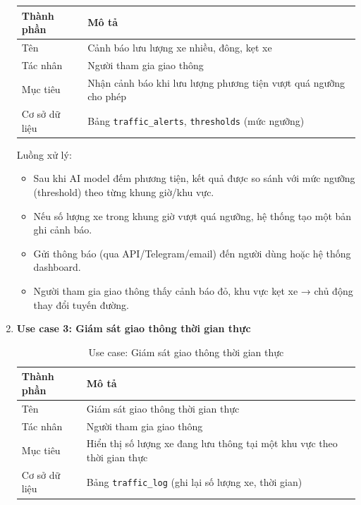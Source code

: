 \begin{enumerate}
    \begin{table}[H]
        \centering
        \begin{tabular}{|p{4cm}|p{10cm}|}
            \hline
            \textbf{Thành phần} & \textbf{Mô tả} \\ \hline
            Tên & Cảnh báo lưu lượng xe nhiều, đông, kẹt xe \\ \hline
            Tác nhân & Người tham gia giao thông \\ \hline
            Mục tiêu & Nhận cảnh báo khi lưu lượng phương tiện vượt quá ngưỡng cho phép \\ \hline
            Cơ sở dữ liệu & Bảng \texttt{traffic\_alerts}, \texttt{thresholds} (mức ngưỡng) \\ \hline
        \end{tabular}
    \end{table}
    \quad Luồng xử lý:
    \begin{itemize}
        \item Sau khi AI model đếm phương tiện, kết quả được so sánh với mức ngưỡng (threshold) theo từng khung giờ/khu vực.
        \item Nếu số lượng xe trong khung giờ vượt quá ngưỡng, hệ thống tạo một bản ghi cảnh báo.
        \item Gửi thông báo (qua API/Telegram/email) đến người dùng hoặc hệ thống dashboard.
        \item Người tham gia giao thông thấy cảnh báo đỏ, khu vực kẹt xe → chủ động thay đổi tuyến đường.
    \end{itemize}
    \item \textbf{Use case 3: Giám sát giao thông thời gian thực}
    \begin{table}[H]
        \centering
        \caption{Use case: Giám sát giao thông thời gian thực}
        \begin{tabular}{|p{4cm}|p{10cm}|}
            \hline
            \textbf{Thành phần} & \textbf{Mô tả} \\ \hline
            Tên & Giám sát giao thông thời gian thực \\ \hline
            Tác nhân & Người tham gia giao thông \\ \hline
            Mục tiêu & Hiển thị số lượng xe đang lưu thông tại một khu vực theo thời gian thực \\ \hline
            Cơ sở dữ liệu & Bảng \texttt{traffic\_log} (ghi lại số lượng xe, thời gian) \\ \hline
        \end{tabular}
    \end{table}


\end{enumerate}
